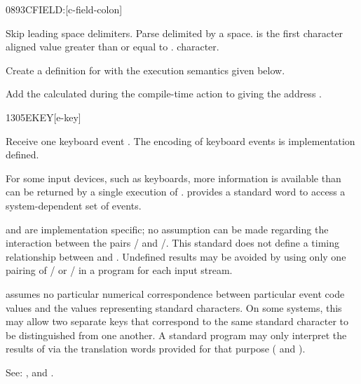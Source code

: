 \vspace*{-3ex}
\begin{worddef}{0893}{CFIELD:}[c-field-colon]%
\item {}

	Skip leading space delimiters. Parse  delimited by
	a space.  is the first character aligned value
	greater than or equal to .  
	character.

	Create a definition for  with the execution semantics
	given below.

\execute[name]

	Add the  calculated during the compile-time action to
	 giving the address .

\end{worddef}


\begin{worddef}{1305}{EKEY}[e-key]
\item {}

	Receive one keyboard event . The encoding of keyboard events
	is implementation defined.


	\begin{rationale} %
		For some input devices, such as keyboards, more information is
		available than can be returned by a single execution of
		.   provides a standard word to access a
		system-dependent set of events.

		 and  are implementation specific; no
		assumption can be made regarding the interaction between the
		pairs / and /.
		This standard does not define a timing relationship between
		 and .  Undefined results may be
		avoided by using only one pairing of / 
		or / in a program for each input
		stream.

		 assumes no particular numerical correspondence
		between particular event code values and the values
		representing standard characters.  On some systems, this may
		allow two separate keys that correspond to the same standard
		character to be distinguished from one another.  A standard
		program may only interpret the results of  via the
		translation words provided for that purpose
		( and ).

		See: ,  and
		.
	\end{rationale}
\end{worddef}

